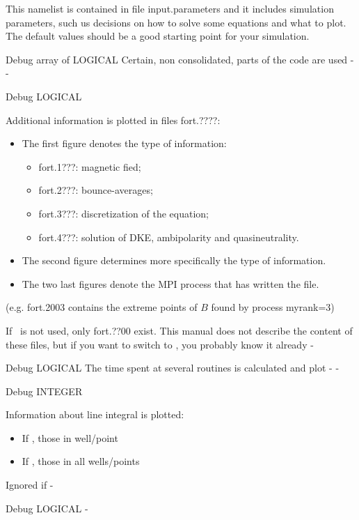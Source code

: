 This namelist is contained in file {\ttfamily input.parameters} and it includes simulation parameters, such us decisions on how to solve some equations and what to plot. The default values should be a good starting point for your simulation.

{Debug}
{array of LOGICAL}
{Certain, non consolidated, parts of the code are used}
{\false}
{-}
{-}

{Debug}
{LOGICAL}
{Additional information is plotted in files {\ttfamily fort.????}:\begin{itemize}
\item The first figure denotes the type of information:\begin{itemize}
\item {\ttfamily fort.1???}: magnetic fied;
\item {\ttfamily fort.2???}: bounce-averages;
\item {\ttfamily fort.3???}: discretization of the equation;
\item {\ttfamily fort.4???}: solution of DKE, ambipolarity and quasineutrality.\end{itemize}
\item The second figure determines more specifically the type of information.
\item The two last figures denote the {\ttfamily MPI} process that has written the file.
\end{itemize}
(e.g. {\ttfamily fort.2003} contains the extreme points of $B$ found by process {\ttfamily myrank=3})}
{\false}
{If \MPI~is not used, only {\ttfamily fort.??00} exist. This manual does not describe the content of these files, but if you want to switch  to \true, you probably know it already}
{-}

{Debug}
{LOGICAL}
{The time spent at several routines is calculated and plot}
{\true}
{-}
{-}

{Debug}
{INTEGER}
{Information about line integral is plotted:\begin{itemize}
\item If , those in well/point 
\item If , those in all wells/points
\end{itemize}}
{\false}
{Ignored if \notf{}}
{-}

{Debug}
{LOGICAL}
{}
{\false}
{-}
{}

